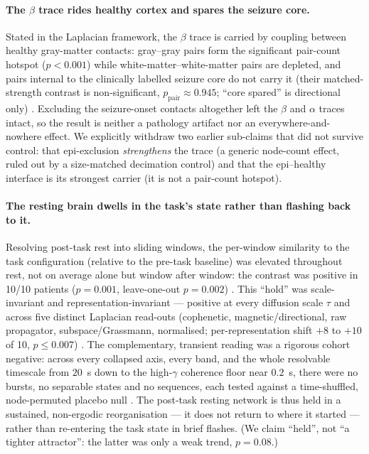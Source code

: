 \documentclass[11pt]{article}
\begin{document}
\paragraph{The \texorpdfstring{$\beta$}{beta} trace rides healthy cortex and
spares the seizure core.}
Stated in the Laplacian framework, the $\beta$ trace is carried by coupling
between healthy gray-matter contacts: gray--gray pairs form the significant
pair-count hotspot ($p<0.001$) while white-matter--white-matter pairs are
depleted, and pairs internal to the clinically labelled seizure core do not carry
it (their matched-strength contrast is non-significant, $p_{\text{pair}}\approx
0.945$; ``core spared'' is directional only)
. Excluding the seizure-onset contacts altogether left the $\beta$ and $\alpha$
traces intact, so the result is neither a pathology artifact nor an
everywhere-and-nowhere effect. We explicitly withdraw two earlier sub-claims that
did not survive control: that epi-exclusion \emph{strengthens} the trace (a
generic node-count effect, ruled out by a size-matched decimation control) and
that the epi--healthy interface is its strongest carrier (it is not a pair-count
hotspot).

\paragraph{The resting brain dwells in the task's state rather than flashing back
to it.}
Resolving post-task rest into sliding windows, the per-window similarity to the
task configuration (relative to the pre-task baseline) was elevated throughout
rest, not on average alone but window after window: the contrast was positive in
10/10 patients ($p=0.001$, leave-one-out $p=0.002$)
. This ``hold'' was scale-invariant and representation-invariant --- positive at
every diffusion scale $\tau$ and across five distinct Laplacian read-outs
(cophenetic, magnetic/directional, raw propagator, subspace/Grassmann,
normalised; per-representation shift $+8$ to $+10$ of 10, $p\le0.007$)
. The complementary, transient reading was a rigorous cohort negative: across
every collapsed axis, every band, and the whole resolvable timescale from $20$~s
down to the high-$\gamma$ coherence floor near $0.2$~s, there were no bursts, no
separable states and no sequences, each tested against a time-shuffled,
node-permuted placebo null
. The post-task resting network is thus held in a sustained, non-ergodic
reorganisation --- it does not return to where it started --- rather than
re-entering the task state in brief flashes. (We claim ``held'', not ``a tighter
attractor'': the latter was only a weak trend, $p=0.08$.)
\end{document}

